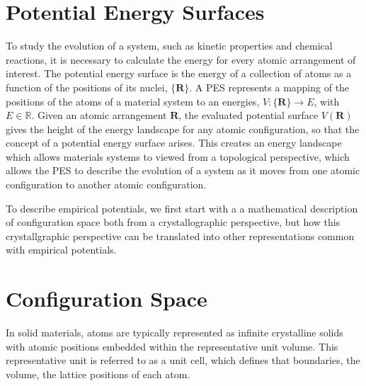 \section{Potential Energy Surfaces}

To study the evolution of a system, such as kinetic properties and chemical reactions, it is necessary to calculate the energy for every atomic arrangement of interest.  The potential energy surface is the energy of a collection of atoms as a function of the positions of its nuclei, $\{\bm{R}\}$.
A PES represents a mapping of the positions of the atoms of a material system to an energies, $V:\{\bm{R}\}\rightarrow E$, with $E\in\mathbb{R}$.
Given an atomic arrangement $\bm{R}$, the evaluated potential surface $V(\bm{R})$ gives the height of the energy landscape for any atomic configuration, so that the concept of a potential energy surface arises.
This creates an energy landscape which allows materials systems to viewed from a topological perspective, which allows the PES to describe the evolution of a system as it moves from one atomic configuration to another atomic configuration.

To describe empirical potentials, we first start with a a mathematical description of configuration space both from a crystallographic perspective, but how this crystallgraphic perspective can be translated into other representations common with empirical potentials.

\section{Configuration Space}
In solid materials, atoms are typically represented as infinite crystalline solids with atomic positions embedded within the representative unit volume.
This representative unit is referred to as a unit cell, which defines that boundaries, the volume, the lattice positions of each atom.

